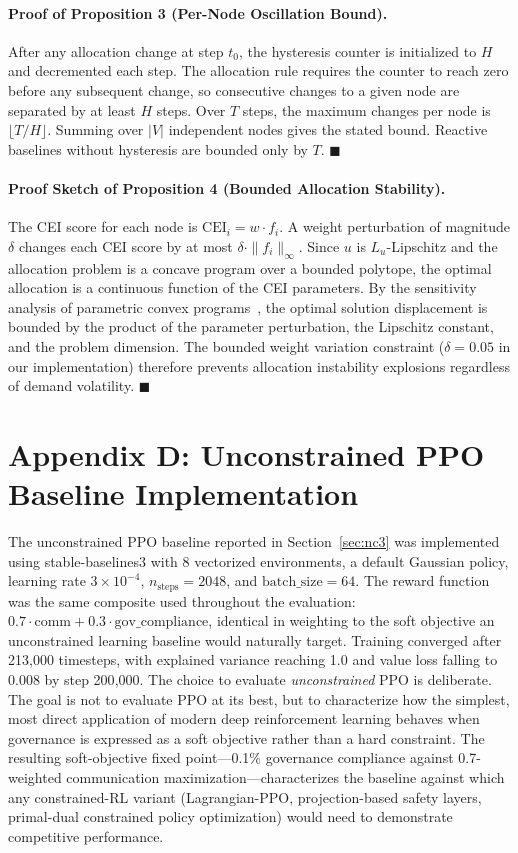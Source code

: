 \documentclass[runningheads]{llncs}
\begin{document}
\paragraph{Proof of Proposition 3 (Per-Node Oscillation Bound).} After any allocation change at step $t_0$, the hysteresis counter is initialized to $H$ and decremented each step. The allocation rule requires the counter to reach zero before any subsequent change, so consecutive changes to a given node are separated by at least $H$ steps. Over $T$ steps, the maximum changes per node is $\lfloor T/H \rfloor$. Summing over $|V|$ independent nodes gives the stated bound. Reactive baselines without hysteresis are bounded only by $T$. $\blacksquare$

\paragraph{Proof Sketch of Proposition 4 (Bounded Allocation Stability).} The CEI score for each node is $\text{CEI}_i = w \cdot f_i$. A weight perturbation of magnitude $\delta$ changes each CEI score by at most $\delta \cdot \|f_i\|_\infty$. Since $u$ is $L_u$-Lipschitz and the allocation problem is a concave program over a bounded polytope, the optimal allocation is a continuous function of the CEI parameters. By the sensitivity analysis of parametric convex programs~\cite{boyd}, the optimal solution displacement is bounded by the product of the parameter perturbation, the Lipschitz constant, and the problem dimension. The bounded weight variation constraint ($\delta = 0.05$ in our implementation) therefore prevents allocation instability explosions regardless of demand volatility. $\blacksquare$

\section*{Appendix D: Unconstrained PPO Baseline Implementation}
\label{app:ppo}

The unconstrained PPO baseline reported in Section~\ref{sec:nc3} was implemented using stable-baselines3 with 8 vectorized environments, a default Gaussian policy, learning rate $3 \times 10^{-4}$, $n_{\text{steps}} = 2048$, and $\text{batch\_size} = 64$. The reward function was the same composite used throughout the evaluation: $0.7 \cdot \text{comm} + 0.3 \cdot \text{gov\_compliance}$, identical in weighting to the soft objective an unconstrained learning baseline would naturally target. Training converged after 213{,}000 timesteps, with explained variance reaching 1.0 and value loss falling to 0.008 by step 200{,}000. The choice to evaluate \emph{unconstrained} PPO is deliberate. The goal is not to evaluate PPO at its best, but to characterize how the simplest, most direct application of modern deep reinforcement learning behaves when governance is expressed as a soft objective rather than a hard constraint. The resulting soft-objective fixed point---0.1\% governance compliance against 0.7-weighted communication maximization---characterizes the baseline against which any constrained-RL variant (Lagrangian-PPO, projection-based safety layers, primal-dual constrained policy optimization) would need to demonstrate competitive performance.
\end{document}

